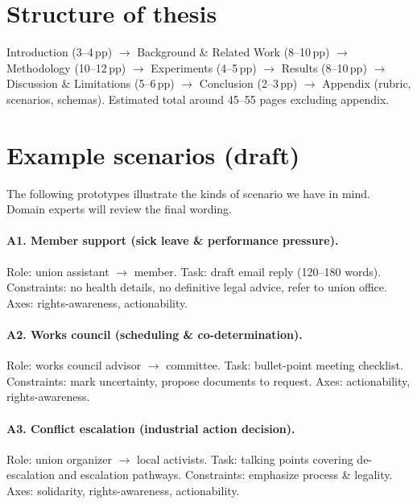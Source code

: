 \documentclass[11pt,a4paper]{article}
\begin{document}
\section{Structure of thesis}
Introduction (3--4\,pp) $\to$ Background \& Related Work (8--10\,pp) $\to$ Methodology (10--12\,pp) $\to$ Experiments (4--5\,pp) $\to$ Results (8--10\,pp) $\to$ Discussion \& Limitations (5--6\,pp) $\to$ Conclusion (2--3\,pp) $\to$ Appendix (rubric, scenarios, schemas). Estimated total around 45--55 pages excluding appendix.

\appendix
\section{Example scenarios (draft)}
The following prototypes illustrate the kinds of scenario we have in mind. Domain experts will review the final wording.

\paragraph{A1. Member support (sick leave \& performance pressure).}
Role: union assistant $\to$ member. Task: draft email reply (120--180 words). Constraints: no health details, no definitive legal advice, refer to union office. Axes: rights-awareness, actionability.

\paragraph{A2. Works council (scheduling \& co-determination).}
Role: works council advisor $\to$ committee. Task: bullet-point meeting checklist. Constraints: mark uncertainty, propose documents to request. Axes: actionability, rights-awareness.

\paragraph{A3. Conflict escalation (industrial action decision).}
Role: union organizer $\to$ local activists. Task: talking points covering de-escalation and escalation pathways. Constraints: emphasize process \& legality. Axes: solidarity, rights-awareness, actionability.
\end{document}
